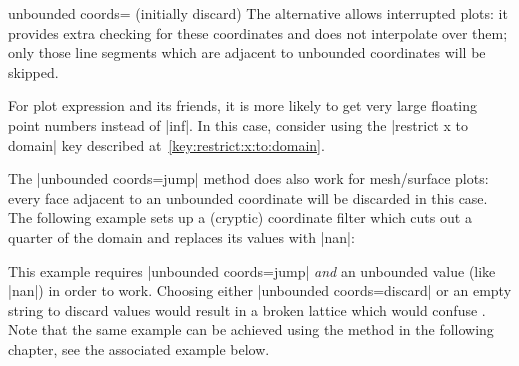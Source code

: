 {\begin{pgfplotskey}{unbounded coords= (initially discard)}
    The alternative  allows interrupted plots: it provides
    extra checking for these coordinates and does not interpolate over them;
    only those line segments which are adjacent to unbounded coordinates will
    be skipped.
\begin{codeexample}[]
\end{codeexample}

    For plot expression and its friends, it is more likely to get very large
    floating point numbers instead of |inf|. In this case, consider using the
    |restrict x to domain| key described at~\ref{key:restrict:x:to:domain}.

    The |unbounded coords=jump| method does also work for mesh/surface plots:
    every face adjacent to an unbounded coordinate will be discarded in this
    case. The following example sets up a (cryptic) coordinate filter which
    cuts out a quarter of the domain and replaces its values with |nan|:

\pgfplotsexpensiveexample
\begin{codeexample}[]
\end{codeexample}
    \noindent This example requires
    |unbounded coords=jump|
    \emph{and} an unbounded value (like |nan|) in order to work. Choosing either
    |unbounded coords=discard| or an empty string to discard values would
    result in a broken lattice which would confuse \PGFPlots{}. Note that the
    same example can be achieved using the method in the following chapter, see
    the associated example below.
\end{pgfplotskey}


}
